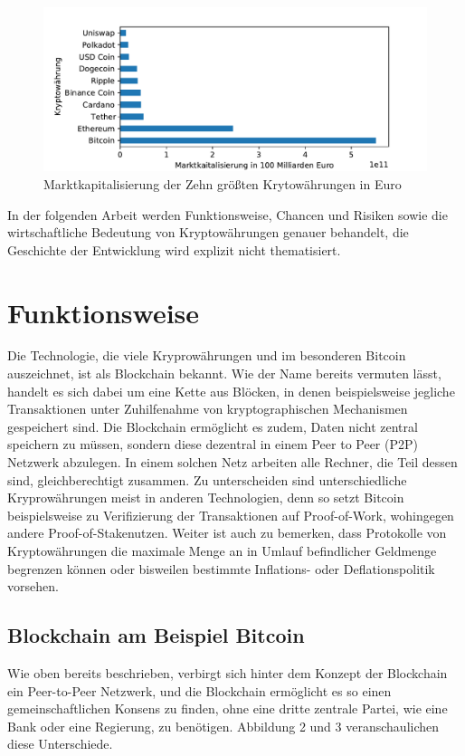 \documentclass[12pt,oneside]{article}
\begin{document}
\begin{figure}[h]
\includegraphics[scale=0.9]{./images/marketcap.pdf}
\caption{Marktkapitalisierung der Zehn größten Krytowährungen in Euro \cite{coinmarketcap}}
\centering
\end{figure}


In der folgenden Arbeit werden Funktionsweise, Chancen und Risiken sowie die wirtschaftliche Bedeutung von Kryptowährungen genauer behandelt, die Geschichte der Entwicklung wird explizit nicht thematisiert.

\section{Funktionsweise}

Die Technologie, die viele Kryprowährungen und im besonderen Bitcoin auszeichnet, ist als Blockchain bekannt. Wie der Name bereits vermuten lässt, handelt es sich dabei um eine \glqq Kette\grqq{} aus \glqq Blöcken\grqq, in denen beispielsweise jegliche Transaktionen unter Zuhilfenahme von kryptographischen Mechanismen gespeichert sind.\cite{soeteman2019}
Die Blockchain ermöglicht es zudem, Daten nicht zentral speichern zu müssen, sondern diese dezentral in einem Peer to Peer (P2P) Netzwerk  abzulegen. In einem solchen Netz arbeiten alle Rechner, die Teil dessen sind, gleichberechtigt zusammen. Zu unterscheiden sind unterschiedliche Kryprowährungen meist in anderen Technologien, denn  so setzt Bitcoin beispielsweise zu Verifizierung der Transaktionen auf \glqq Proof-of-Work\grqq, wohingegen andere \glqq Proof-of-Stake\grqq nutzen. Weiter ist auch zu bemerken, dass Protokolle von Kryptowährungen die maximale Menge an in Umlauf befindlicher Geldmenge begrenzen können oder bisweilen bestimmte Inflations- oder Deflationspolitik vorsehen. \cite{wegner2019}


\subsection{Blockchain am Beispiel Bitcoin}
Wie oben bereits beschrieben, verbirgt sich hinter dem Konzept der Blockchain ein Peer-to-Peer Netzwerk, und die Blockchain ermöglicht es so einen gemeinschaftlichen Konsens zu finden, ohne eine dritte zentrale Partei, wie eine Bank oder eine Regierung, zu benötigen. Abbildung 2 und 3 veranschaulichen diese Unterschiede. 
\end{document}
